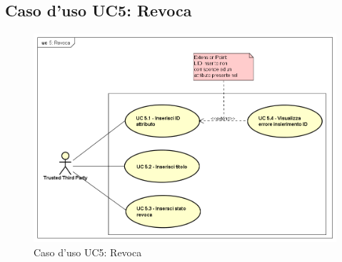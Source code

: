 \subsection{Caso d'uso UC5: Revoca}
\begin{figure}[h]
	\centering
	\includegraphics[scale=0.50]{immagini/usecase/UC5_Revoca}
	\caption{Caso d'uso UC5: Revoca}
\end{figure}
